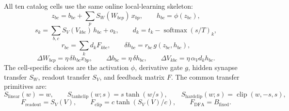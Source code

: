 \documentclass[11pt]{article}
\begin{document}
All ten catalog cells use the same online local-learning skeleton:
\[
  z_{bc}=b_{bc}+\sum_p S_W(W_{bcp})\,x_{bp},
  \qquad
  h_{bc}=\phi(z_{bc}),
\]
\[
  s_k=\sum_{b,c}S_V(V_{kbc})\,h_{bc}+o_k,
  \qquad
  d_k=t_k-\operatorname{softmax}(s/T)_k,
\]
\[
  r_{bc}=\sum_k d_k F_{kbc},
  \qquad
  \delta h_{bc}=r_{bc}\,g(z_{bc},h_{bc}),
\]
\[
  \Delta W_{bcp}=\eta\,\delta h_{bc}x_{bp},
  \qquad
  \Delta b_{bc}=\eta\,\delta h_{bc},
  \qquad
  \Delta V_{kbc}=\eta\,\alpha_V d_k h_{bc}.
\]
The cell-specific choices are the activation \(\phi\), derivative gate \(g\),
hidden synapse transfer \(S_W\), readout transfer \(S_V\), and feedback matrix
\(F\).  The common transfer primitives are:
\[
  S_{\mathrm{linear}}(w)=w,\qquad
  S_{\mathrm{tanhclip}}(w;s)=s\tanh(w/s),\qquad
  S_{\mathrm{hardclip}}(w;s)=\operatorname{clip}(w,-s,s),
\]
\[
  F_{\mathrm{readout}}=S_V(V),\qquad
  F_{\mathrm{clip}}=c\tanh(S_V(V)/c),\qquad
  F_{\mathrm{DFA}}=B_{\mathrm{fixed}}.
\]
\end{document}

